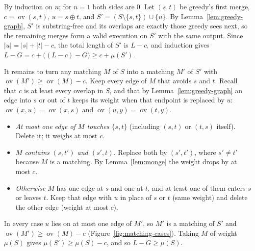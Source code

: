 \documentclass[11pt,a4paper]{article}   %
\makeatletter
\renewenvironment{proof}[1][\proofname]{\par
  \pushQED{\qed}%
  \normalfont \topsep1\p@\@plus1\p@\relax
  \trivlist
  \item[\hskip\labelsep\itshape #1\@addpunct{.}]\ignorespaces
}{\popQED\endtrivlist\@endpefalse}
\theoremstyle{compact}
\theoremstyle{compactdef}
\newcommand{\GR}{G}                         %
\newcommand{\ov}{\operatorname{ov}}         %
\makeatother
\begin{document}
\begin{proof}
By induction on $n$; for $n=1$ both sides are $0$. Let $(s,t)$ be greedy's
first merge, $c=\ov(s,t)$, $u=s\oplus t$, and
$S'=(S\setminus\{s,t\})\cup\{u\}$. By Lemma~\ref{lem:greedy-graph}, $S'$ is
substring-free and its overlaps are exactly those greedy sees next, so the
remaining merges form a valid execution on $S'$ with the same output.
Since $|u|=|s|+|t|-c$, the total length of $S'$ is $L-c$, and induction
gives $L-\GR = c+\bigl((L-c)-\GR\bigr)\ge c+\mu(S')$.
 
It remains to turn any matching $M$ of $S$ into a matching $M'$ of $S'$
with $\ov(M')\ge\ov(M)-c$. Keep every edge of $M$ that avoids $s$ and $t$.
Recall that $c$ is at least every overlap in $S$, and that by
Lemma~\ref{lem:greedy-graph} an edge into $s$ or out of $t$ keeps its
weight when that endpoint is replaced by $u$:
$\ov(x,u)=\ov(x,s)$ and $\ov(u,y)=\ov(t,y)$.
\begin{itemize}
  \item \emph{At most one edge of $M$ touches $\{s,t\}$} (including
        $(s,t)$ or $(t,s)$ itself). Delete it; it weighs at most $c$.
  \item \emph{$M$ contains $(s,t')$ and $(s',t)$.} Replace both by
        $(s',t')$, where $s'\neq t'$ because $M$ is a matching. By
        Lemma~\ref{lem:monge} the weight drops by at most $c$.
  \item \emph{Otherwise} $M$ has one edge at $s$ and one at $t$, and at
        least one of them enters $s$ or leaves $t$. Keep that edge with $u$
        in place of $s$ or $t$ (same weight) and delete the other edge
        (weight at most $c$).
\end{itemize}
In every case $u$ lies on at most one edge of $M'$, so $M'$ is a matching
of $S'$ and $\ov(M')\ge\ov(M)-c$ (Figure~\ref{fig:matching-cases}). Taking
$M$ of weight $\mu(S)$ gives $\mu(S')\ge\mu(S)-c$, and so $L-\GR\ge\mu(S)$.
\end{proof}
\end{document}
